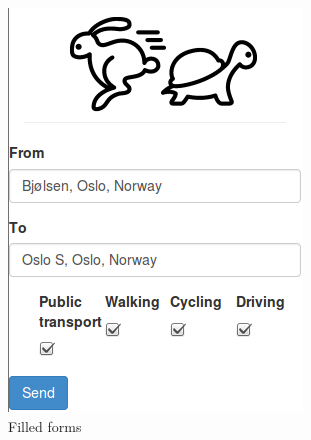 \documentclass[10pt,a4paper]{article}
\begin{document}
\begin{figure}[h]
  \centering
  \begin{subfigure}{0.4\textwidth}
    \includegraphics[width=\textwidth]{../ux/filled}
    \caption{Filled forms}
    \label{fig:ux_filled}
  \end{subfigure}
\hfill
\begin{subfigure}{0.4\textwidth}

\end{subfigure}
\end{figure}
\end{document}
